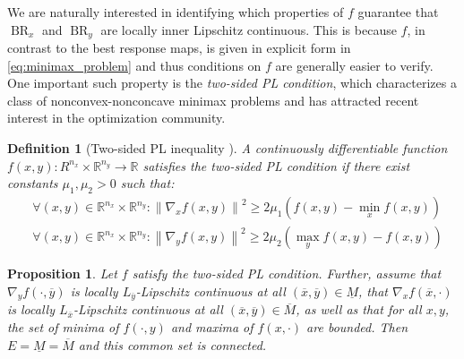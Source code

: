 \documentclass{article}
\newtheorem{definition}{Definition}[section]
\newtheorem{prop}{Proposition}
\newcommand{\R}{\mathbb{R}}
\newcommand{\lilc}{locally inner Lipschitz continuous}
\DeclareMathOperator{\BR}{BR}
\begin{document}
We are naturally interested in identifying which properties of $f$ guarantee that $\BR_x$ and $\BR_y$ are \lilc. This is because $f$, in contrast to the best response maps, is given in explicit form in \eqref{eq:minimax_problem} and thus conditions on $f$ are generally easier to verify. One important such property is the \emph{two-sided PL condition}, which characterizes a class of nonconvex-nonconcave minimax problems and has attracted recent interest in the optimization community.

\begin{definition}[Two-sided PL inequality \citep{yang2020global}]
    \label{def:2PL}
A continuously differentiable function $f(x, y):R^{n_x}\times \R^{n_y}\to \R$ satisfies the two-sided PL condition if there exist constants $\mu_1, \mu_2>0$ such that:
$$
\begin{aligned}
&\forall (x,y)\in \R^{n_x}\times \R^{n_y}: \left\|\nabla_x f(x, y)\right\|^2 \geq 2 \mu_1\left(f(x, y)-\min _x f(x, y)\right) \\
& \forall (x,y)\in \R^{n_x}\times \R^{n_y}:\left\|\nabla_y f(x, y)\right\|^2 \geq 2 \mu_2\left(\max _y f(x, y)-f(x, y)\right)
\end{aligned}
$$
\end{definition}

\begin{prop}
\label{prop:PLconnected}
Let $f$ satisfy the two-sided PL condition. Further, assume that $\nabla_y f(\cdot,\overline{y})$ is locally $L_{\overline{y}}$-Lipschitz continuous at all $(\overline{x},\overline{y})\in \underline{M}$, that $\nabla_x f(\overline{x},\cdot)$ is locally $L_{\overline{x}}$-Lipschitz continuous at all $(\overline{x},\overline{y})\in \overline{M}$, as well as that for all $x,y$, the set of minima of $f(\cdot,y)$ and maxima of $f(x,\cdot)$ are bounded. Then $E=\underline{M}=\overline{M}$ and this common set is connected.
\end{prop}
\end{document}
